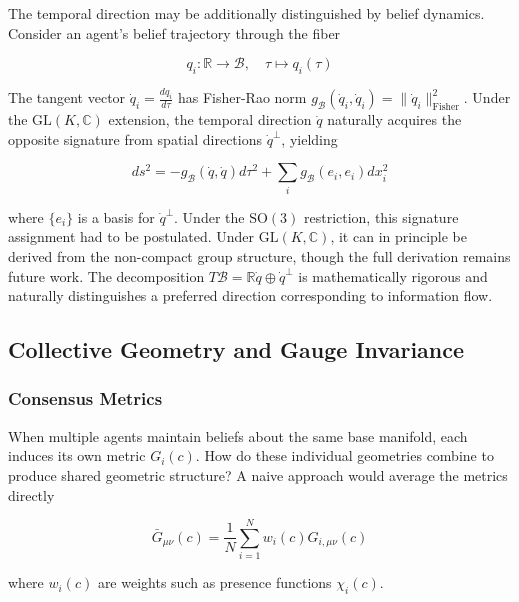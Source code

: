 \documentclass[11pt]{article}
\begin{document}
The temporal direction may be additionally distinguished by belief dynamics. Consider an agent's belief trajectory through the fiber

\begin{equation}
q_i: \mathbb{R} \to \mathcal{B}, \quad \tau \mapsto q_i(\tau)
\end{equation}

The tangent vector $\dot{q}_i = \frac{dq_i}{d\tau}$ has Fisher-Rao norm $g_{\mathcal{B}}(\dot{q}_i, \dot{q}_i) = \|\dot{q}_i\|^2_{\text{Fisher}}$. Under the $\mathrm{GL}(K, \mathbb{C})$ extension, the temporal direction $\dot{q}$ naturally acquires the opposite signature from spatial directions $\dot{q}^\perp$, yielding

\begin{equation}
ds^2 = -g_{\mathcal{B}}(\dot{q}, \dot{q}) d\tau^2 + \sum_i g_{\mathcal{B}}(e_i, e_i) dx_i^2
\end{equation}

where $\{e_i\}$ is a basis for $\dot{q}^\perp$. Under the $\mathrm{SO}(3)$ restriction, this signature assignment had to be postulated. Under $\mathrm{GL}(K, \mathbb{C})$, it can in principle be derived from the non-compact group structure, though the full derivation remains future work. The decomposition $T\mathcal{B} = \mathbb{R}\dot{q} \oplus \dot{q}^\perp$ is mathematically rigorous and naturally distinguishes a preferred direction corresponding to information flow.

\subsection{Collective Geometry and Gauge Invariance}

\subsubsection{Consensus Metrics}

When multiple agents maintain beliefs about the same base manifold, each induces its own metric $G_i(c)$. How do these individual geometries combine to produce shared geometric structure? A naive approach would average the metrics directly

\begin{equation}
\bar{G}_{\mu\nu}(c) = \frac{1}{N}\sum_{i=1}^N w_i(c) G_{i,\mu\nu}(c)
\end{equation}

where $w_i(c)$ are weights such as presence functions $\chi_i(c)$.
\end{document}
